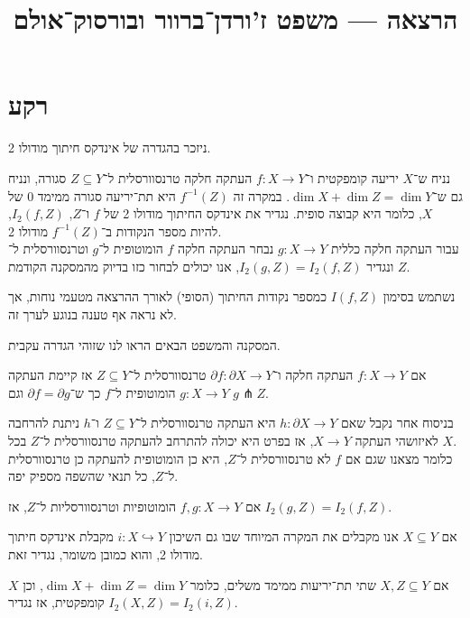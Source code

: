 
\setcounter{secnumdepth}{2}

\title{הרצאה --- משפט ז'ורדן־ברוור ובורסוק־אולם}



\section{רקע}
ניזכר בהגדרה של אינדקס חיתוך מודולו 2.
\begin{definition}
	נניח ש־$X$ יריעה קומפקטית ו־$f : X \to Y$ העתקה חלקה טרנסוורסלית ל־$Z \subseteq Y$ סגורה, ונניח גם ש־$\dim X + \dim Z = \dim Y$.
	במקרה זה $f^{-1}(Z)$ היא תת־יריעה סגורה ממימד $0$ של $X$, כלומר היא קבוצה סופית.
	נגדיר את אינדקס החיתוך מודולו 2 של $f$ ו־$Z$, $I_2(f, Z)$, להיות מספר הנקודות ב־$f^{-1}(Z)$ מודולו 2. \\
	עבור העתקה חלקה כללית $g : X \to Y$ נבחר העתקה חלקה $f$ הומוטופית ל־$g$ וטרנסוורסלית ל־$Z$ ונגדיר $I_2(g, Z) = I_2(f, Z)$, אנו יכולים לבחור כזו בדיוק מהמסקנה הקודמת.
\end{definition}
\begin{remark}
	נשתמש בסימון $I(f, Z)$ כמספר נקודות החיתוך (הסופי) לאורך ההרצאה מטעמי נוחות, אך לא נראה אף טענה בנוגע לערך זה.
\end{remark}
המסקנה והמשפט הבאים הראו לנו שזוהי הגדרה עקבית.
\begin{corollary}
	אם $f : X \to Y$ העתקה חלקה ו־$\partial f : \partial X \to Y$ טרנסוורסלית ל־$Z \subseteq Y$ אז קיימת העתקה $g : X \to Y$ הומוטופית ל־$f$ כך ש־$\partial f = \partial g$ וגם $g \pitchfork Z$.
\end{corollary}
בניסוח אחר נקבל שאם $h : \partial X \to Y$ היא העתקה טרנסוורסלית ל־$Z \subseteq Y$ ו־$h$ ניתנת להרחבה לאיזושהי העתקה $X \to Y$, אז בפרט היא יכולה להתרחב להעתקה טרנסוורסלית ל־$Z$ בכל $X$. \\
כלומר מצאנו שגם אם $f$ לא טרנסוורסלית ל־$Z$, היא כן הומוטופית להעתקה כן טרנסוורסלית ל־$Z$, כל תנאי שהשפה מספיק יפה.
\begin{theorem}
	אם $f, g : X \to Y$ הומוטופיות וטרנסוורסליות ל־$Z$, אז $I_2(g, Z) = I_2(f, Z)$.
\end{theorem}
אם $X \subseteq Y$ אנו מקבלים את המקרה המיוחד שבו גם השיכון $i : X \hookrightarrow Y$ מקבלת אינדקס חיתוך מודולו 2, והוא כמובן משומר, נגדיר זאת.
\begin{definition}
	אם $X, Z \subseteq Y$ שתי תת־יריעות ממימד משלים, כלומר $\dim X + \dim Z = \dim Y$, וכן $X$ קומפקטית, אז נגדיר $I_2(X, Z) = I_2(i, Z)$.
\end{definition}
